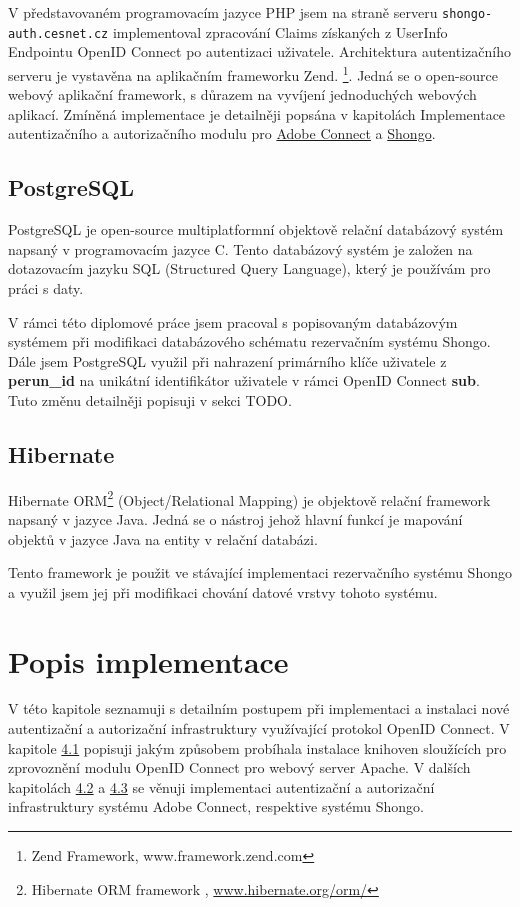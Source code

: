 \documentclass[
  printed, %
  twoside, %
  table,   %
  nolof,     %
  nolot,     %
]{fithesis3}
\begin{document}
V představovaném programovacím jazyce PHP jsem na straně serveru \texttt{shongo-auth.cesnet.cz} implementoval zpracování Claims získaných z UserInfo Endpointu OpenID Connect po autentizaci uživatele. Architektura autentizačního serveru je vystavěna na aplikačním frameworku Zend. \footnote{Zend Framework, www.framework.zend.com}. Jedná se o open-source webový aplikační framework, s důrazem na vyvíjení jednoduchých webových aplikací. Zmíněná implementace je detailněji popsána v kapitolách Implementace autentizačního a autorizačního modulu pro \hyperref[ACImpl]{Adobe Connect} a \hyperref[ShongoImpl]{Shongo}. \par

\section{PostgreSQL}
PostgreSQL \cite{postgresql} je open-source multiplatformní objektově relační databázový systém napsaný v programovacím jazyce C. Tento databázový systém je založen na dotazovacím jazyku SQL (Structured Query Language), který je používám pro práci s daty. 
\par

V rámci této diplomové práce jsem pracoval s popisovaným databázovým systémem při modifikaci databázového schématu rezervačním systému Shongo. Dále jsem PostgreSQL využil při nahrazení primárního klíče uživatele z \textbf{perun\_id} na unikátní identifikátor uživatele v rámci OpenID Connect \textbf{sub}. Tuto změnu detailněji popisuji v sekci TODO. 

\section{Hibernate}
Hibernate ORM\footnote{Hibernate ORM framework , \url{www.hibernate.org/orm/}} (Object/Relational Mapping) je objektově relační framework napsaný v jazyce Java. Jedná se o nástroj jehož hlavní funkcí je mapování objektů v jazyce Java na entity v relační databázi.
\par
Tento framework je použit ve stávající implementaci rezervačního systému Shongo a využil jsem jej při modifikaci chování datové vrstvy tohoto systému.  


\chapter{Popis implementace}
V této kapitole seznamuji s detailním postupem při implementaci a instalaci nové autentizační a autorizační infrastruktury využívající protokol OpenID Connect. V kapitole \hyperref[apacheConfig]{4.1} popisuji jakým způsobem probíhala instalace knihoven sloužících pro zprovoznění modulu OpenID Connect pro webový server Apache. V dalších kapitolách \hyperref[ACImpl]{4.2} a \hyperref[ShongoImpl]{4.3} se věnuji implementaci autentizační a autorizační infrastruktury systému Adobe Connect, respektive systému Shongo.   
\end{document}
